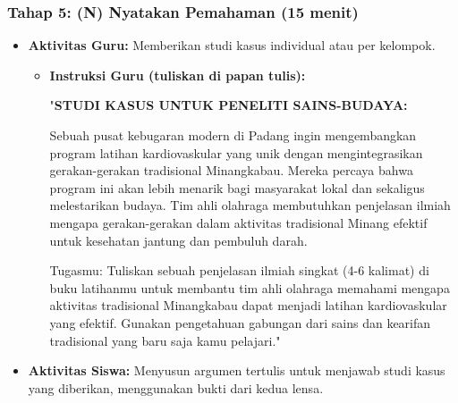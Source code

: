 \documentclass[a4paper,12pt]{article}
\begin{document}
\subsubsection{Tahap 5: (N) Nyatakan Pemahaman (15 menit)}
\begin{itemize}
\item \textbf{Aktivitas Guru:} Memberikan studi kasus individual atau per kelompok.
    \begin{itemize}
    \item \textbf{Instruksi Guru (tuliskan di papan tulis):}
    
    "\textbf{STUDI KASUS UNTUK PENELITI SAINS-BUDAYA:}
    
    Sebuah pusat kebugaran modern di Padang ingin mengembangkan program latihan kardiovaskular yang unik dengan mengintegrasikan gerakan-gerakan tradisional Minangkabau. Mereka percaya bahwa program ini akan lebih menarik bagi masyarakat lokal dan sekaligus melestarikan budaya. Tim ahli olahraga membutuhkan penjelasan ilmiah mengapa gerakan-gerakan dalam aktivitas tradisional Minang efektif untuk kesehatan jantung dan pembuluh darah.
    
    Tugasmu: Tuliskan sebuah penjelasan ilmiah singkat (4-6 kalimat) di buku latihanmu untuk membantu tim ahli olahraga memahami mengapa aktivitas tradisional Minangkabau dapat menjadi latihan kardiovaskular yang efektif. Gunakan pengetahuan gabungan dari sains dan kearifan tradisional yang baru saja kamu pelajari."
    \end{itemize}
\item \textbf{Aktivitas Siswa:} Menyusun argumen tertulis untuk menjawab studi kasus yang diberikan, menggunakan bukti dari kedua lensa.
\end{itemize}
\end{document}
